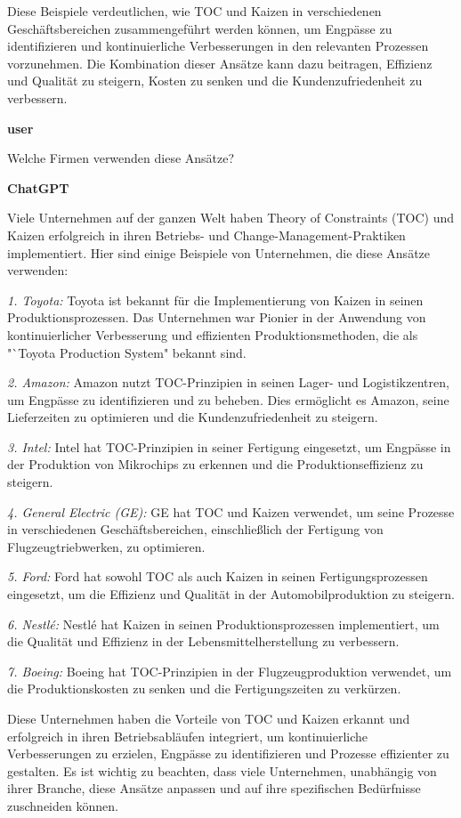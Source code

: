 Diese Beispiele verdeutlichen, wie TOC und Kaizen in verschiedenen Geschäftsbereichen zusammengeführt werden können, um Engpässe zu identifizieren und kontinuierliche Verbesserungen in den relevanten Prozessen vorzunehmen. Die Kombination dieser Ansätze kann dazu beitragen, Effizienz und Qualität zu steigern, Kosten zu senken und die Kundenzufriedenheit zu verbessern.

\textbf{user}

Welche Firmen verwenden diese Ansätze? 
 
\textbf{ChatGPT}

Viele Unternehmen auf der ganzen Welt haben Theory of Constraints (TOC) und Kaizen erfolgreich in ihren Betriebs- und Change-Management-Praktiken implementiert. Hier sind einige Beispiele von Unternehmen, die diese Ansätze verwenden:

\textit{1. Toyota:} Toyota ist bekannt für die Implementierung von Kaizen in seinen Produktionsprozessen. Das Unternehmen war Pionier in der Anwendung von kontinuierlicher Verbesserung und effizienten Produktionsmethoden, die als "`Toyota Production System" bekannt sind.

\textit{2. Amazon:} Amazon nutzt TOC-Prinzipien in seinen Lager- und Logistikzentren, um Engpässe zu identifizieren und zu beheben. Dies ermöglicht es Amazon, seine Lieferzeiten zu optimieren und die Kundenzufriedenheit zu steigern.

\textit{3. Intel:} Intel hat TOC-Prinzipien in seiner Fertigung eingesetzt, um Engpässe in der Produktion von Mikrochips zu erkennen und die Produktionseffizienz zu steigern.

\textit{4. General Electric (GE):} GE hat TOC und Kaizen verwendet, um seine Prozesse in verschiedenen Geschäftsbereichen, einschließlich der Fertigung von Flugzeugtriebwerken, zu optimieren.

\textit{5. Ford:} Ford hat sowohl TOC als auch Kaizen in seinen Fertigungsprozessen eingesetzt, um die Effizienz und Qualität in der Automobilproduktion zu steigern.

\textit{6. Nestlé:} Nestlé hat Kaizen in seinen Produktionsprozessen implementiert, um die Qualität und Effizienz in der Lebensmittelherstellung zu verbessern.

\textit{7. Boeing:} Boeing hat TOC-Prinzipien in der Flugzeugproduktion verwendet, um die Produktionskosten zu senken und die Fertigungszeiten zu verkürzen.

Diese Unternehmen haben die Vorteile von TOC und Kaizen erkannt und erfolgreich in ihren Betriebsabläufen integriert, um kontinuierliche Verbesserungen zu erzielen, Engpässe zu identifizieren und Prozesse effizienter zu gestalten. Es ist wichtig zu beachten, dass viele Unternehmen, unabhängig von ihrer Branche, diese Ansätze anpassen und auf ihre spezifischen Bedürfnisse zuschneiden können.

